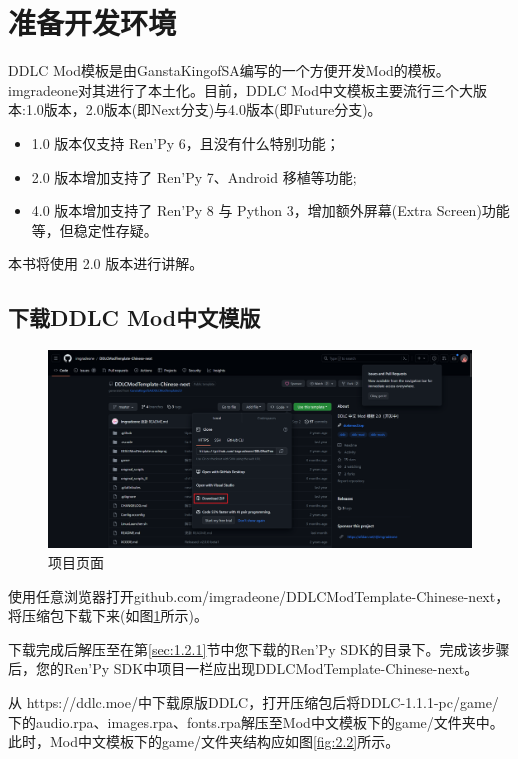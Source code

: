 \section{准备开发环境}
DDLC Mod模板是由GanstaKingofSA编写的一个方便开发Mod的模板。imgradeone对其进行了本土化。目前，DDLC Mod中文模板主要流行三个大版本:1.0版本，2.0版本(即Next分支)与4.0版本(即Future分支)。
\begin{itemize}
    \item 1.0 版本仅支持 Ren'Py 6，且没有什么特别功能；
    \item 2.0 版本增加支持了 Ren'Py 7、Android 移植等功能;
    \item 4.0 版本增加支持了 Ren'Py 8 与 Python 3，增加额外屏幕(Extra Screen)功能等，但稳定性存疑。
\end{itemize}

本书将使用 2.0 版本进行讲解。

\subsection{下载DDLC Mod中文模版}

\begin{figure}[htb]
    \centering
    \includegraphics[scale=.15]{Pictures/2/2.1/2.1.1}
    \caption{项目页面}
    \label{fig:2.1}
\end{figure}
使用任意浏览器打开github.com/imgradeone/DDLCModTemplate-Chinese-next，将压缩包下载下来(如图\ref{fig:2.1}所示)。

下载完成后解压至在第\ref{sec:1.2.1}节中您下载的Ren'Py SDK的目录下。完成该步骤后，您的Ren'Py SDK中项目一栏应出现DDLCModTemplate-Chinese-next。

从 https://ddlc.moe/中下载原版DDLC，打开压缩包后将DDLC-1.1.1-pc/game/下的audio.rpa、images.rpa、fonts.rpa解压至Mod中文模板下的game/文件夹中。此时，Mod中文模板下的game/文件夹结构应如图\ref{fig:2.2}所示。

